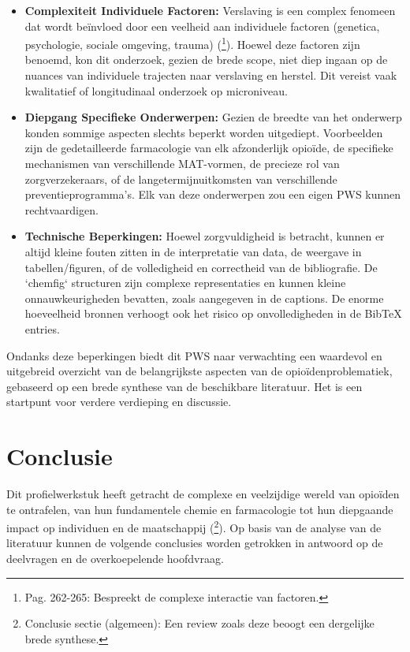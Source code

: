 \documentclass[11pt, a4paper]{report} %
\begin{document}
\begin{itemize}
    \item \textbf{Complexiteit Individuele Factoren:} Verslaving is een complex fenomeen dat wordt beïnvloed door een veelheid aan individuele factoren (genetica, psychologie, sociale omgeving, trauma) (\cite{Cicero2017Review}\footnote{Pag. 262-265: Bespreekt de complexe interactie van factoren.}). Hoewel deze factoren zijn benoemd, kon dit onderzoek, gezien de brede scope, niet diep ingaan op de nuances van individuele trajecten naar verslaving en herstel. Dit vereist vaak kwalitatief of longitudinaal onderzoek op microniveau.
    \item \textbf{Diepgang Specifieke Onderwerpen:} Gezien de breedte van het onderwerp konden sommige aspecten slechts beperkt worden uitgediept. Voorbeelden zijn de gedetailleerde farmacologie van elk afzonderlijk opioïde, de specifieke mechanismen van verschillende MAT-vormen, de precieze rol van zorgverzekeraars, of de langetermijnuitkomsten van verschillende preventieprogramma's. Elk van deze onderwerpen zou een eigen PWS kunnen rechtvaardigen.
    \item \textbf{Technische Beperkingen:} Hoewel zorgvuldigheid is betracht, kunnen er altijd kleine fouten zitten in de interpretatie van data, de weergave in tabellen/figuren, of de volledigheid en correctheid van de bibliografie. De `chemfig` structuren zijn complexe representaties en kunnen kleine onnauwkeurigheden bevatten, zoals aangegeven in de captions. De enorme hoeveelheid bronnen verhoogt ook het risico op onvolledigheden in de BibTeX entries.
\end{itemize}
Ondanks deze beperkingen biedt dit PWS naar verwachting een waardevol en uitgebreid overzicht van de belangrijkste aspecten van de opioïdenproblematiek, gebaseerd op een brede synthese van de beschikbare literatuur. Het is een startpunt voor verdere verdieping en discussie.

\chapter{Conclusie}
\label{ch:conclusie}

Dit profielwerkstuk heeft getracht de complexe en veelzijdige wereld van opioïden te ontrafelen, van hun fundamentele chemie en farmacologie tot hun diepgaande impact op individuen en de maatschappij (\cite{Maclean2020EconomicStudiesOpioid}\footnote{Conclusie sectie (algemeen): Een review zoals deze beoogt een dergelijke brede synthese.}). Op basis van de analyse van de literatuur kunnen de volgende conclusies worden getrokken in antwoord op de deelvragen en de overkoepelende hoofdvraag.
\end{document}

